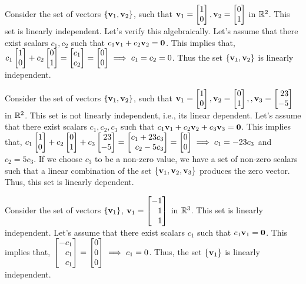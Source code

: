 \begin{boxedstuff}
    \begin{example}
        Consider the set of vectors $\left\{ \mathbf{v}_1, \mathbf{v}_2 \right\}$, such that $\mf{v}_1 = \bmx 1 \\ 0 \emx, \mf{v}_2 = \bmx 0 \\ 1 \emx$ in $\mathbb{R}^2$. This set is linearly independent. Let's verify this algebraically. Let's assume that there exist scalars $c_1, c_2$ such that $c_1 \mathbf{v}_1 + c_2 \mathbf{v}_2 = \mathbf{0}$. This implies that, $c_1 \bmx 1 \\ 0 \emx + c_2 \bmx 0 \\ 1 \emx = \bmx c_1 \\ c_2 \emx = \bmx 0 \\ 0 \emx \implies c_1 = c_2 = 0$. Thus the set $\left\{ \mathbf{v}_1, \mathbf{v}_2 \right\}$ is linearly independent. 
    \end{example}

    \begin{example}
        Consider the set of vectors $\left\{ \mathbf{v}_1, \mathbf{v}_2 \right\}$, such that $\mf{v}_1 = \bmx 1 \\ 0 \emx, \mf{v}_2 = \bmx 0 \\ 1 \emx, , \mf{v}_3 = \bmx 23 \\ -5 \emx$ in $\mathbb{R}^2$. This set is not linearly independent, i.e., its linear dependent. Let's assume that there exist scalars $c_1, c_2, c_3$ such that $c_1 \mathbf{v}_1 + c_2 \mathbf{v}_2 + c_3 \mathbf{v}_3 = \mathbf{0}$. This implies that, $c_1 \bmx 1 \\ 0 \emx + c_2 \bmx 0 \\ 1 \emx + c_3 \bmx 23 \\ -5 \emx = \bmx c_1 + 23c_3\\ c_2  - 5 c_3 \emx = \bmx 0 \\ 0 \emx \implies c_1 = -23c_3$ and $c_2 = 5c_3$. If we choose $c_3$ to be a non-zero value, we have a set of non-zero scalars such that a linear combination of the set $\left\{ \mathbf{v}_1, \mathbf{v}_2, \mathbf{v}_3 \right\}$ produces the zero vector. Thus, this set is linearly dependent.
    \end{example}

    \begin{example}
        Consider the set of vectors $\left\{ \mathbf{v}_1 \right\}$, $\mf{v}_1 = \bmx -1 \\ 1 \\ 1 \emx$ in $\mathbb{R}^3$. This set is linearly independent. Let's assume that there exist scalars $c_1$ such that $c_1 \mathbf{v}_1 = \mathbf{0}$. This implies that, $\bmx -c_1 \\ c_1 \\ c_1 \emx = \bmx 0 \\ 0 \\ 0 \emx \implies c_1 = 0$. Thus, the set $\left\{ \mathbf{v}_1 \right\}$ is linearly independent.
    \end{example}


\end{boxedstuff}
